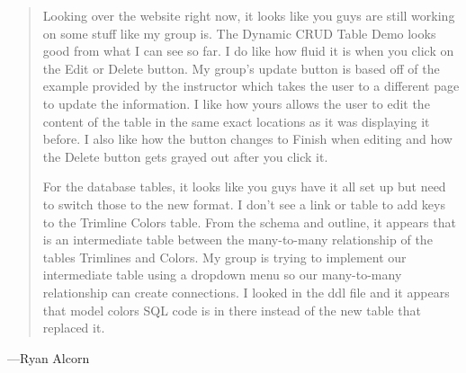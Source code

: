 \documentclass[11pt,letterpaper,oneside]{amsart}
\begin{document}
\begin{quotation}

Looking over the website right now, it looks like you guys are still working on some stuff like my group is. The Dynamic CRUD Table Demo looks good from what I can see so far. I do like how fluid it is when you click on the Edit or Delete button. My group's update button is based off of the example provided by the instructor which takes the user to a different page to update the information. I like how yours allows the user to edit the content of the table in the same exact locations as it was displaying it before. I also like how the button changes to Finish when editing and how the Delete button gets grayed out after you click it.

For the database tables, it looks like you guys have it all set up but need to switch those to the new format. I don't see a link or table to add keys to the Trimline Colors table. From the schema and outline, it appears that is an intermediate table between the many-to-many relationship of the tables Trimlines and Colors. My group is trying to implement our intermediate table using a dropdown menu so our many-to-many relationship can create connections. I looked in the ddl file and it appears that model colors SQL code is in there instead of the new table that replaced it.

\end{quotation}

---Ryan Alcorn
\end{document}
